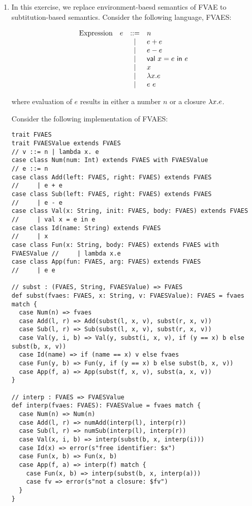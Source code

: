 \begin{enumerate}
\item In this exercise, we replace environment-baesd semantics of FVAE to subtitution-based semantics.
Consider the following language, FVAES:

\[
\begin{array}{lrcl}
\text{Expression} & e & ::= & n \\
&& | & e+e\\
&& | & e-e \\
&& | & \textsf{val}\ x=e\ \textsf{in}\ e \\
&& | & x \\
&& | & \lambda x.e \\
&& | & e\ e \\
\end{array}
\]

where evaluation of $e$ results in either a number $n$ or a closure $\lambda x.e$.

Consider the following implementation of FVAES:
\begin{verbatim}
trait FVAES
trait FVAESValue extends FVAES                                       // v ::= n | lambda x. e
case class Num(num: Int) extends FVAES with FVAESValue               // e ::= n
case class Add(left: FVAES, right: FVAES) extends FVAES              //     | e + e
case class Sub(left: FVAES, right: FVAES) extends FVAES              //     | e - e
case class Val(x: String, init: FVAES, body: FVAES) extends FVAES    //     | val x = e in e
case class Id(name: String) extends FVAES                            //     | x
case class Fun(x: String, body: FVAES) extends FVAES with FVAESValue //     | lambda x.e
case class App(fun: FVAES, arg: FVAES) extends FVAES                 //     | e e

// subst : (FVAES, String, FVAESValue) => FVAES
def subst(fvaes: FVAES, x: String, v: FVAESValue): FVAES = fvaes match {
  case Num(n) => fvaes
  case Add(l, r) => Add(subst(l, x, v), subst(r, x, v))
  case Sub(l, r) => Sub(subst(l, x, v), subst(r, x, v))
  case Val(y, i, b) => Val(y, subst(i, x, v), if (y == x) b else subst(b, x, v))
  case Id(name) => if (name == x) v else fvaes
  case Fun(y, b) => Fun(y, if (y == x) b else subst(b, x, v))
  case App(f, a) => App(subst(f, x, v), subst(a, x, v))
}

// interp : FVAES => FVAESValue
def interp(fvaes: FVAES): FVAESValue = fvaes match {
  case Num(n) => Num(n)
  case Add(l, r) => numAdd(interp(l), interp(r))
  case Sub(l, r) => numSub(interp(l), interp(r))
  case Val(x, i, b) => interp(subst(b, x, interp(i)))
  case Id(x) => error(s"free identifier: $x")
  case Fun(x, b) => Fun(x, b)
  case App(f, a) => interp(f) match {
    case Fun(x, b) => interp(subst(b, x, interp(a)))
    case fv => error(s"not a closure: $fv")
  }
}
\end{verbatim}


\end{enumerate}
